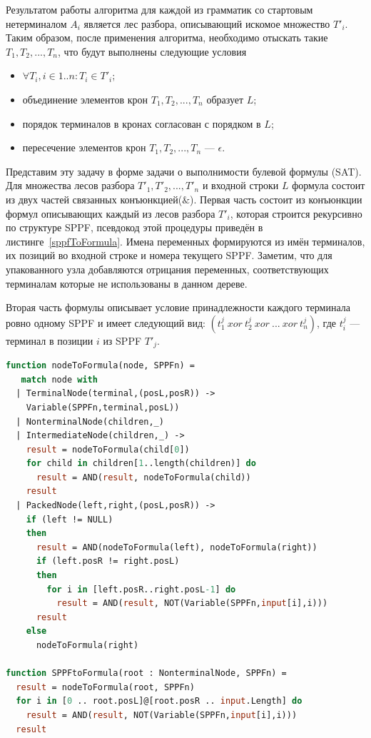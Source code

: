 \documentclass[14pt]{matmex-diploma-custom}
\begin{document}
    Результатом работы алгоритма для каждой из грамматик со стартовым нетерминалом $A_i$ является лес разбора, описывающий
    искомое множество $T'_i$. Таким образом, после применения алгоритма, необходимо отыскать такие $T_1, T_2, ..., T_n$, что 
    будут выполнены следующие условия
    \begin{itemize}
    	\item $\forall T_i, i \in 1..n : T_i \in T'_i$;
    	\item объединение элементов крон $T_1, T_2, ..., T_n$ образует $L$;
    	\item порядок терминалов в кронах согласован с порядком в $L$;
    	\item пересечение элементов крон $T_1, T_2, ..., T_n$ --- $\epsilon$.
    \end{itemize}

	Представим эту задачу в форме задачи о выполнимости булевой формулы (SAT). 
	Для множества лесов разбора $T'_1, T'_2, ..., T'_n$ и входной строки $L$ формула состоит из двух
	частей связанных конъюнкцией($\&$). Первая часть состоит из конъюнкции формул описывающих
	каждый из лесов разбора $T'_i$, которая строится рекурсивно по структуре SPPF, псевдокод этой процедуры приведён в листинге~\ref{sppfToFormula}. 
	Имена переменных формируются из имён терминалов, их позиций во входной строке и номера текущего SPPF.
	Заметим, что для упакованного узла добавляются отрицания переменных, соответствующих терминалам которые не использованы в данном дереве.
	
	Вторая часть формулы описывает условие принадлежности каждого терминала ровно одному SPPF и имеет 
	следующий вид: $(t_1^j\ xor\ t_2^j\ xor\ ...\ xor\	 t_n^j)$, где $t_i^j$ --- терминал в позиции $i$ из SPPF $T'_j$.

	\begin{lstlisting}[caption={Функция SPPFtoFormula, преобразующая SPPF в булеву формулу},
	                   captionpos=b,
	                   label={sppfToFormula},
	                   language=Caml,
	                   basicstyle=\small]
 function nodeToFormula(node, SPPFn) =
   match node with
  | TerminalNode(terminal,(posL,posR)) ->
    Variable(SPPFn,terminal,posL))
  | NonterminalNode(children,_)
  | IntermediateNode(children,_) ->
    result = nodeToFormula(child[0])
    for child in children[1..length(children)] do
      result = AND(result, nodeToFormula(child))
    result
  | PackedNode(left,right,(posL,posR)) ->
    if (left != NULL)
    then
      result = AND(nodeToFormula(left), nodeToFormula(right))
      if (left.posR != right.posL)
      then
        for i in [left.posR..right.posL-1] do
          result = AND(result, NOT(Variable(SPPFn,input[i],i)))
      result
    else
      nodeToFormula(right)
 
function SPPFtoFormula(root : NonterminalNode, SPPFn) = 
  result = nodeToFormula(root, SPPFn)
  for i in [0 .. root.posL]@[root.posR .. input.Length] do
    result = AND(result, NOT(Variable(SPPFn,input[i],i)))
  result
   	\end{lstlisting}
	
\end{document}
